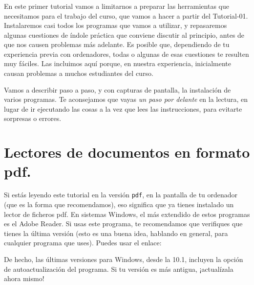 \documentclass[10pt,a4paper]{article}\usepackage[]{graphicx}\usepackage[]{color}
\begin{document}
\subsubsection*{}

En este primer tutorial vamos a limitarnos a preparar las herramientas que necesitamos para el
trabajo del curso, que vamos a hacer a partir del Tutorial-01. Instalaremos casi todos los
programas que vamos a utilizar, y repasaremos algunas cuestiones de índole práctica que conviene
discutir al principio, antes de que nos causen problemas más adelante. Es posible que, dependiendo
de tu experiencia previa con ordenadores, todas o algunas de esas cuestiones te resulten muy
fáciles. Las incluimos aquí porque, en nuestra experiencia, inicialmente causan problemas a muchos
estudiantes del curso.

Vamos a describir paso a paso, y con capturas de pantalla, la instalación de varios programas. Te
aconsejamos que vayas {\em un paso por delante} en la lectura, en lugar de ir ejecutando las cosas
a la vez que lees las instrucciones, para evitarte sorpresas o errores.

\section{Lectores de documentos en formato pdf.}
\label{tut00:sec:LectoresPdf}

Si estás leyendo este tutorial en la versión {\tt pdf}, en la pantalla de tu ordenador (que es la
forma que recomendamos), eso significa que ya tienes instalado un lector de ficheros pdf. En
sistemas Windows, el más extendido de estos programas es el Adobe Reader. Si usas este programa, te
recomendamos que verifiques que tienes la última versión (esto es una buena idea, hablando en
general, para cualquier programa que uses). Puedes usar el enlace:
\begin{center}
\end{center}
De hecho, las últimas versiones para Windows, desde la 10.1, incluyen la opción de
autoactualización del programa. Si tu versión es más antigua, ¡actualízala ahora mismo!
\end{document}
